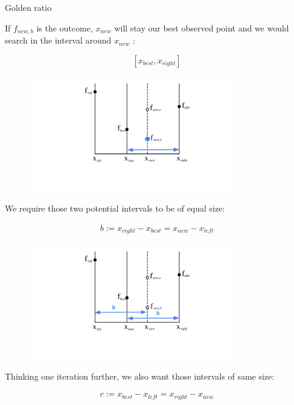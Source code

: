 \documentclass[11pt,compress,t,notes=noshow, xcolor=table]{beamer}
\begin{document}
\begin{vbframe}{Golden ratio}
\framebreak 

If $f_{new, b}$ is the outcome, $x_{new}$ will stay our best observed point and we would search in the interval around $x_{new}$ : 

$$
    [x_{best}, x_{right}] 
$$

\begin{figure}
\includegraphics[width=0.8\textwidth]{figure_man/goldensec-2.png}\\
\end{figure}

\framebreak 

We require those two potential intervals to be of equal size: 

\begin{eqnarray*}
    b := x_{right} - x_{best} = x_{new} - x_{left}
\end{eqnarray*}

\begin{figure}
\includegraphics[width=0.8\textwidth]{figure_man/goldensec-3.png}\\
\end{figure}

\framebreak 

Thinking one iteration further, we also want those intervals of same size: 

\begin{eqnarray*}
    c := x_{best} - x_{left} = x_{right} - x_{new}
\end{eqnarray*}


\end{vbframe}
\end{document}
